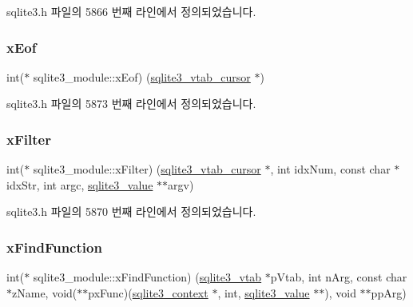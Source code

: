 sqlite3.\+h 파일의 5866 번째 라인에서 정의되었습니다.

\mbox{\label{structsqlite3__module_afad8fda57fb28a01196230bc554e44b1}} 
\subsubsection{\texorpdfstring{x\+Eof}{xEof}}
{\footnotesize\ttfamily int($\ast$ sqlite3\+\_\+module\+::x\+Eof) (\hyperlink{structsqlite3__vtab__cursor}{sqlite3\+\_\+vtab\+\_\+cursor} $\ast$)}



sqlite3.\+h 파일의 5873 번째 라인에서 정의되었습니다.

\mbox{\label{structsqlite3__module_a46ba11ba4d07f7fdcab4f35bf2045300}} 
\subsubsection{\texorpdfstring{x\+Filter}{xFilter}}
{\footnotesize\ttfamily int($\ast$ sqlite3\+\_\+module\+::x\+Filter) (\hyperlink{structsqlite3__vtab__cursor}{sqlite3\+\_\+vtab\+\_\+cursor} $\ast$, int idx\+Num, const char $\ast$idx\+Str, int argc, \hyperlink{sqlite3_8h_ac2fa1ecdb2290d9af6010edbd1cbc83c}{sqlite3\+\_\+value} $\ast$$\ast$argv)}



sqlite3.\+h 파일의 5870 번째 라인에서 정의되었습니다.

\mbox{\label{structsqlite3__module_afb7bf9d156a767a50f5e9d92b135a80f}} 
\subsubsection{\texorpdfstring{x\+Find\+Function}{xFindFunction}}
{\footnotesize\ttfamily int($\ast$ sqlite3\+\_\+module\+::x\+Find\+Function) (\hyperlink{structsqlite3__vtab}{sqlite3\+\_\+vtab} $\ast$p\+Vtab, int n\+Arg, const char $\ast$z\+Name, void($\ast$$\ast$px\+Func)(\hyperlink{sqlite3_8h_a3b519553ffec8fc42b2356f5b1ebdc57}{sqlite3\+\_\+context} $\ast$, int, \hyperlink{sqlite3_8h_ac2fa1ecdb2290d9af6010edbd1cbc83c}{sqlite3\+\_\+value} $\ast$$\ast$), void $\ast$$\ast$pp\+Arg)}



